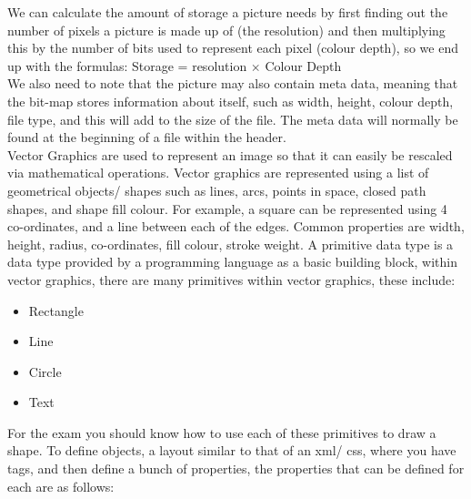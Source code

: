   We can calculate the amount of storage a picture needs by first finding out the number of pixels a picture is made up of (the resolution) and then multiplying this by the number of bits used to represent each pixel (colour depth), so we end up with the formulas: Storage = resolution $\times$ Colour Depth \\
  We also need to note that the picture may also contain meta data, meaning that the bit-map stores information about itself, such as width, height, colour depth, file type, and this will add to the size of the file. The meta data will normally be found at the beginning of a file within the header.\\
  
  \noindent
  Vector Graphics are used to represent an image so that it can easily be rescaled via mathematical operations. Vector graphics are represented using a list of geometrical objects/ shapes such as lines, arcs, points in space, closed path shapes, and shape  fill colour. For example, a square can be represented using 4 co-ordinates, and a line between each of the edges. Common properties are width, height, radius, co-ordinates, fill colour, stroke weight. A primitive data type is a data type provided by a programming language as a basic building block, within vector graphics, there are many primitives within vector graphics, these include:
  \begin{itemize}
  	\item Rectangle
  	\item Line
  	\item Circle
  	\item Text
  \end{itemize}
  For the exam you should know how to use each of these primitives to draw a shape. To define objects, a layout similar to that of an xml/ css, where you have tags, and then define a bunch of properties, the properties that can be defined for each are as follows:
